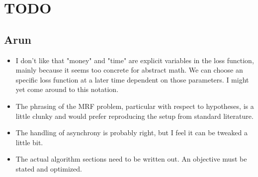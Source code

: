 \section{TODO}

\subsection{Arun}

\begin{itemize}
  \item I don't like that "money" and "time" are explicit variables in the loss function, mainly because it seems too concrete for abstract math. We can choose an specific loss function at a later time dependent on those parameters. I might yet come around to this notation.
  \item The phrasing of the MRF problem, particular with respect to hypotheses, is a little clunky and would prefer reproducing the setup from standard literature.
  \item The handling of asynchrony is probably right, but I feel it can
    be tweaked a little bit.
  \item The actual algorithm sections need to be written out. An
    objective must be stated and optimized.
\end{itemize}
